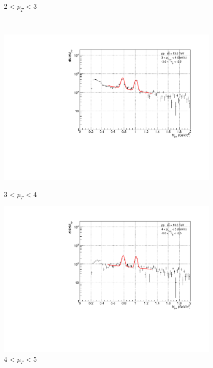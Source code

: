 \begin{figure}[H]
\begin{minipage}{0.45\textwidth}
                        \captionsetup{labelformat=empty}
                        \caption*{2 < $p_{T}$ < 3}
                    \end{minipage}
                    \\
                    \vspace{1em}
                    \begin{minipage}{0.45\textwidth}
                        \centering
                        \includegraphics[width=\textwidth]{fig/3_4_2_fit_pt_3to4.pdf}
                        \captionsetup{labelformat=empty}
                        \caption*{3 < $p_{T}$ < 4}
                    \end{minipage}
                    \hfill
                    \begin{minipage}{0.45\textwidth}
                        \centering
                        \includegraphics[width=\textwidth]{fig/3_4_2_fit_pt_4to5.pdf}
                        \captionsetup{labelformat=empty}
                        \caption*{4 < $p_{T}$ < 5} 
    

\end{minipage}
\end{figure}

